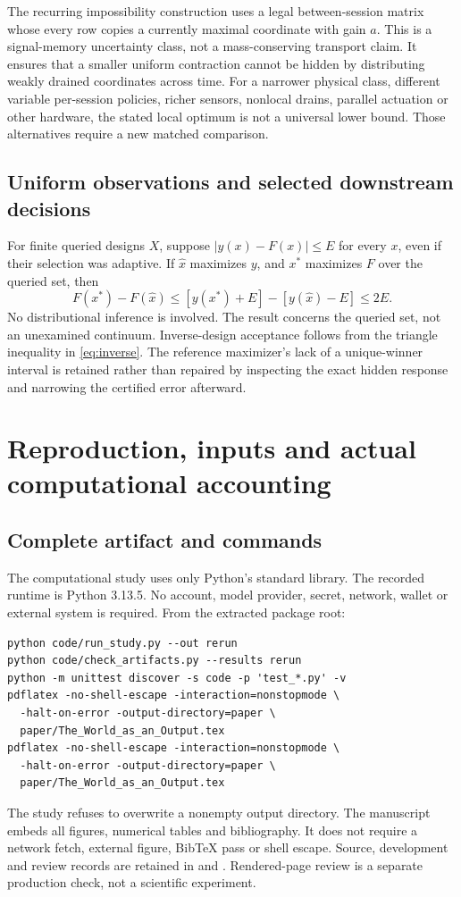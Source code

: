 \documentclass[11pt,letterpaper]{article}
\theoremstyle{definition}\newtheorem{definition}[theorem]{Definition}
\theoremstyle{remark}\newtheorem{remark}[theorem]{Remark}
\begin{document}
The recurring impossibility construction uses a legal between-session matrix whose every row copies a currently maximal coordinate with gain $a$. This is a signal-memory uncertainty class, not a mass-conserving transport claim. It ensures that a smaller uniform contraction cannot be hidden by distributing weakly drained coordinates across time. For a narrower physical class, different variable per-session policies, richer sensors, nonlocal drains, parallel actuation or other hardware, the stated local optimum is not a universal lower bound. Those alternatives require a new matched comparison.

\subsection{Uniform observations and selected downstream decisions}
For finite queried designs $X$, suppose $|y(x)-F(x)|\leq E$ for every $x$, even if their selection was adaptive. If $\hat x$ maximizes $y$, and $x^*$ maximizes $F$ over the queried set, then
\begin{equation}
 F(x^*)-F(\hat x)\leq[y(x^*)+E]-[y(\hat x)-E]\leq2E.
\end{equation}
No distributional inference is involved. The result concerns the queried set, not an unexamined continuum. Inverse-design acceptance follows from the triangle inequality in \eqref{eq:inverse}. The reference maximizer's lack of a unique-winner interval is retained rather than repaired by inspecting the exact hidden response and narrowing the certified error afterward.

\section{Reproduction, inputs and actual computational accounting}
\label{app:reproduce}
\subsection{Complete artifact and commands}
The computational study uses only Python's standard library. The recorded runtime is Python 3.13.5. No account, model provider, secret, network, wallet or external system is required. From the extracted package root:
\begin{lstlisting}
python code/run_study.py --out rerun
python code/check_artifacts.py --results rerun
python -m unittest discover -s code -p 'test_*.py' -v
pdflatex -no-shell-escape -interaction=nonstopmode \
  -halt-on-error -output-directory=paper \
  paper/The_World_as_an_Output.tex
pdflatex -no-shell-escape -interaction=nonstopmode \
  -halt-on-error -output-directory=paper \
  paper/The_World_as_an_Output.tex
\end{lstlisting}
The study refuses to overwrite a nonempty output directory. The manuscript embeds all figures, numerical tables and bibliography. It does not require a network fetch, external figure, BibTeX pass or shell escape. Source, development and review records are retained in  and . Rendered-page review is a separate production check, not a scientific experiment.
\end{document}
